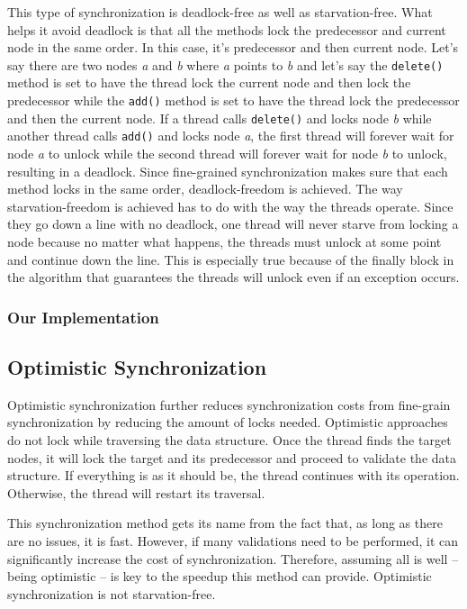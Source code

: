 \documentclass[conference]{IEEEtran}
\begin{document}
This type of synchronization is deadlock-free as well as starvation-free. What helps it avoid deadlock is that all the methods lock the predecessor and current node in the same order. In this case, it’s predecessor and then current node. Let’s say there are two nodes \textit{a} and \textit{b} where \textit{a} points to \textit{b} and let’s say the \verb|delete()| method is set to have the thread lock the current node and then lock the predecessor while the \verb|add()| method is set to have the thread lock the predecessor and then the current node. If a thread calls \verb|delete()| and locks node \textit{b} while another thread calls \verb|add()| and locks node \textit{a}, the first thread will forever wait for node \textit{a} to unlock while the second thread will forever wait for node \textit{b} to unlock, resulting in a deadlock. Since fine-grained synchronization makes sure that each method locks in the same order, deadlock-freedom is achieved. The way starvation-freedom is achieved has to do with the way the threads operate. Since they go down a line with no deadlock, one thread will never starve from locking a node because no matter what happens, the threads must unlock at some point and continue down the line. This is especially true because of the finally block in the algorithm that guarantees the threads will unlock even if an exception occurs.\cite{textbook}

\subsubsection{Our Implementation}

\subsection{Optimistic Synchronization}
Optimistic synchronization further reduces synchronization costs from fine-grain synchronization by reducing the amount of locks needed. \cite{textbook} Optimistic approaches do not lock while traversing the data structure. Once the thread finds the target nodes, it will lock the target and its predecessor and proceed to validate the data structure. If everything is as it should be, the thread continues with its operation. Otherwise, the thread will restart its traversal. 

This synchronization method gets its name from the fact that, as long as there are no issues, it is fast. However, if many validations need to be performed, it can significantly increase the cost of synchronization. Therefore, assuming all is well -- being optimistic -- is key to the speedup this method can provide. Optimistic synchronization is not starvation-free.
\end{document}
